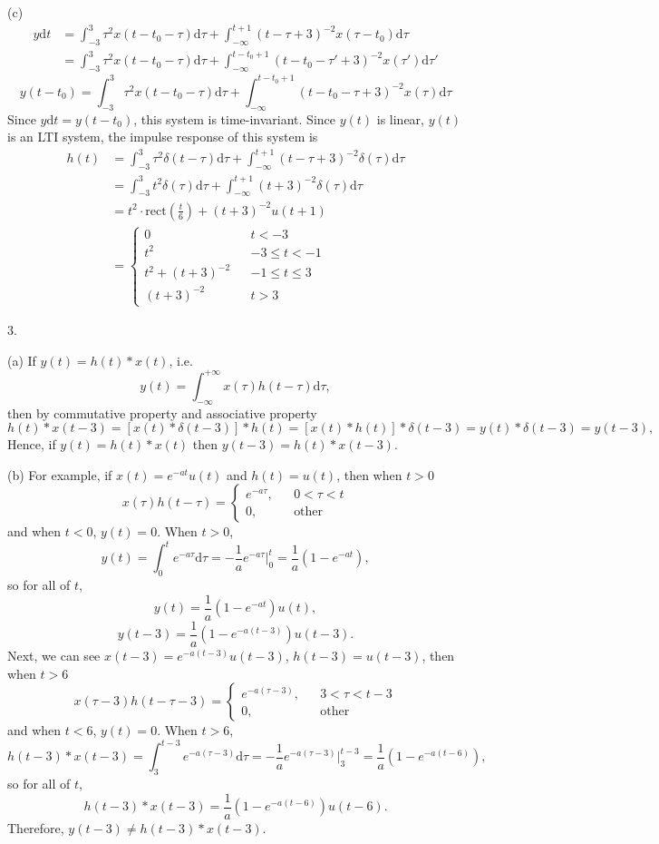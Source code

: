 \documentclass[a4paper]{article}
\begin{document}
(c)
\begin{align*}
    y\mathrm{d}t&=\int_{-3}^3\tau^2x(t-t_0-\tau)\mathrm{d}\tau+\int_{-\infty}^{t+1}(t-\tau+3)^{-2}x(\tau-t_0)\mathrm{d}\tau\\
    &=\int_{-3}^3\tau^2x(t-t_0-\tau)\mathrm{d}\tau+\int_{-\infty}^{t-t_0+1}(t-t_0-\tau'+3)^{-2}x(\tau')\mathrm{d}\tau'
\end{align*}
$$y(t-t_0)=\int_{-3}^3\tau^2x(t-t_0-\tau)\mathrm{d}\tau+\int_{-\infty}^{t-t_0+1}(t-t_0-\tau+3)^{-2}x(\tau)\mathrm{d}\tau$$
Since $y\mathrm{d}t=y(t-t_0)$, this system is time-invariant. Since $y(t)$ is linear, $y(t)$ is an LTI system, the impulse response of this system is
\begin{align*}
    h(t)&=\int_{-3}^3\tau^2\delta(t-\tau)\mathrm{d}\tau+\int_{-\infty}^{t+1}(t-\tau+3)^{-2}\delta(\tau)\mathrm{d}\tau\\
    &=\int_{-3}^3t^2\delta(\tau)\mathrm{d}\tau+\int_{-\infty}^{t+1}(t+3)^{-2}\delta(\tau)\mathrm{d}\tau\\
    &=t^2\cdot\mathrm{rect}(\frac{t}{6})+(t+3)^{-2}u(t+1)\\
    &=\left\{
        \begin{array}{lcl}
            0&&{t<-3}\\
            t^2&&{-3\leq t<-1}\\
            t^2+(t+3)^{-2}&&{-1\leq t\leq3}\\
            (t+3)^{-2}&&{t>3}
        \end{array}
    \right.
\end{align*}

3.

(a) If $y(t)=h(t)*x(t)$, i.e.
$$y(t)=\int_{-\infty}^{+\infty} x(\tau)h(t-\tau)\mathrm{d}\tau,$$
then by commutative property and associative property
$$h(t)*x(t-3)=[x(t)*\delta(t-3)]*h(t)=[x(t)*h(t)]*\delta(t-3)=y(t)*\delta(t-3)=y(t-3),$$
Hence, if $y(t)=h(t)*x(t)$ then $\boxed{y(t-3)=h(t)*x(t-3)}$.

(b) For example, if $x(t)=e^{-at}u(t)$ and $h(t)=u(t)$, then when $t>0$
$$x(\tau)h(t-\tau)=\left\{
    \begin{array}{lcl}
        e^{-a\tau},&&0<\tau<t\\
        0,&&\text{other}
    \end{array}
\right.$$
and when $t<0$, $y(t)=0$. When $t>0$,
$$y(t)=\int_0^te^{-a\tau}\mathrm{d}\tau=-\frac{1}{a}e^{-a\tau}\bigg|_0^t=\frac{1}{a}(1-e^{-at}),$$
so for all of $t$,
$$y(t)=\frac{1}{a}(1-e^{-at})u(t),$$
$$y(t-3)=\frac{1}{a}(1-e^{-a(t-3)})u(t-3).$$
Next, we can see $x(t-3)=e^{-a(t-3)}u(t-3)$, $h(t-3)=u(t-3)$, then when $t>6$
$$x(\tau-3)h(t-\tau-3)=\left\{
    \begin{array}{lcl}
        e^{-a(\tau-3)},&&3<\tau<t-3\\
        0,&&\text{other}
    \end{array}
\right.$$
and when $t<6$, $y(t)=0$. When $t>6$,
$$h(t-3)*x(t-3)=\int_3^{t-3}e^{-a(\tau-3)}\mathrm{d}\tau=-\frac{1}{a}e^{-a(\tau-3)}\bigg|_3^{t-3}=\frac{1}{a}(1-e^{-a(t-6)}),$$
so for all of $t$,
$$h(t-3)*x(t-3)=\frac{1}{a}(1-e^{-a(t-6)})u(t-6).$$
Therefore, $\boxed{y(t-3)\neq h(t-3)*x(t-3)}$.
\end{document}
